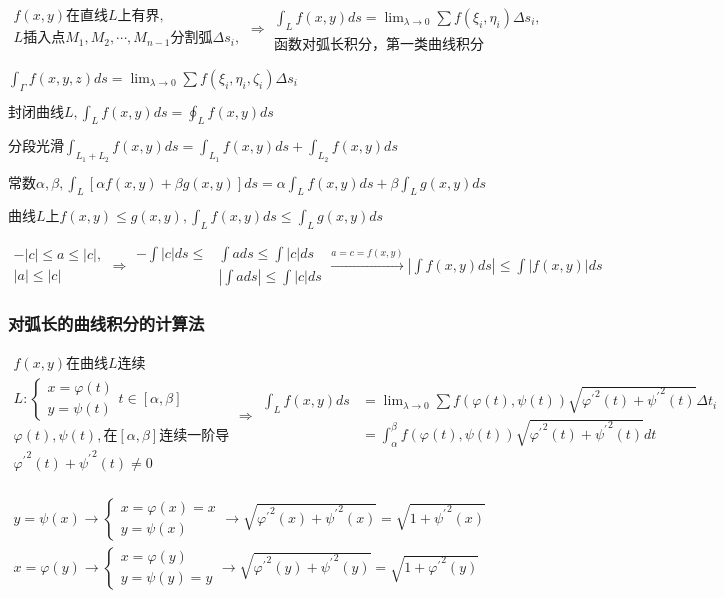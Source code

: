 \documentclass[UTF8]{ctexart}
\newcommand{\mt}[1]{\text{#1}}
\newcommand{\mb}[1]{\textbf{#1}}
\newcommand{\mf}[1]{\left( #1\right)}
\newcommand{\mfa}[1]{\left| #1\right|}
\newcommand{\mfc}[1]{\left[ #1 \right]}
\newcommand{\p}{\par}
\newcommand{\ma}[1]{\begin{array}{llll} #1 \end{array}}
\newcommand{\fcz}[1] {
    \left\{
        \begin{array}{llll} #1 \end{array}
    \right.
}
\begin{document}
$\ma{f\mf{x,y}\mt{在直线}L\mt{上有界},\\
L\mt{插入点}M_1,M_2,\cdots,M_{n-1}\mt{分割弧}\Delta s_i,\\
}\Rightarrow
\ma{\int_Lf\mf{x,y}ds=\lim_{\lambda \rightarrow 0}\sum f\mf{\xi_i,\eta_i}\Delta s_i,\\ 
\mb{函数对弧长积分，第一类曲线积分}}$\p

$\int_\Gamma f\mf{x,y,z}ds=\lim_{\lambda \rightarrow 0}\sum f\mf{\xi_i,\eta_i,\zeta_i}\Delta s_i$

$\mt{封闭曲线}L,\int_Lf\mf{x,y}ds=\oint_Lf\mf{x,y}ds $

$\mt{分段光滑}\int_{L_1+L_2}f\mf{x,y}ds=\int_{L_1 }f\mf{x,y}ds+\int_{ L_2}f\mf{x,y}ds$

$\mt{常数}\alpha ,\beta,\int_L \mfc{\alpha f\mf{x,y}+\beta g\mf{x,y}} ds=\alpha\int_L f\mf{x,y}ds+\beta\int_L g\mf{x,y}ds$

$\mt{曲线}L\mt{上}f\mf{x,y}\leqslant g\mf{x,y}, \int_L f\mf{x,y}ds \leqslant \int_L g\mf{x,y}ds$

$\ma{-\mfa{c} \leqslant a \leqslant \mfa{c} ,\\ \mfa{a}\leqslant \mfa{c}}\Rightarrow   \ma{-\int \mfa{c}ds \leqslant &\int ads \leqslant \int \mfa{c}ds\\ &\mfa{\int ads}\leqslant \int \mfa{c}ds} \xrightarrow{a=c=f\mf{x,y} } \mfa{\int f\mf{x,y}ds}\leqslant \int \mfa{f\mf{x,y}}ds$

\subsubsection{对弧长的曲线积分的计算法}


$\ma{
    f\mf{x,y}\mt{在}\mt{曲线}L\mt{连续}\\
    L:\fcz{x=\varphi\mf{t}\\
            y=\psi\mf{t}}   t\in \mfc{\alpha,\beta}\\
    \varphi\mf{t},\psi\mf{t},\mt{在} \mfc{\alpha,\beta}\mt{连续一阶导}\\
    {\varphi^{'}}^2\mf{t}+{\psi^{'}}^2\mf{t} \neq 0\\
}\Rightarrow \ma{
    \int_Lf\mf{x,y}ds&=\lim_{\lambda \rightarrow 0}\sum f\mf{\varphi\mf{t},\psi\mf{t}}\sqrt{{\varphi^{'}}^2\mf{t}+{\psi^{'}}^2\mf{t}}\Delta t_i\\
    &=\int_\alpha^\beta f\mf{\varphi\mf{t},\psi\mf{t}}\sqrt{{\varphi^{'}}^2\mf{t}+{\psi^{'}}^2\mf{t}}dt
}$


$\ma{
    y=\psi\mf{x} \rightarrow \fcz{
        x=\varphi\mf{x}=x\\
        y=\psi\mf{x}
    }\rightarrow \sqrt{{\varphi^{'}}^2\mf{x}+{\psi^{'}}^2\mf{x}}=\sqrt{1+{\psi^{'}}^2\mf{x}}\\

    x=\varphi\mf{y} \rightarrow \fcz{
       
        x=\varphi\mf{y}\\
        y=\psi\mf{y}=y
    }\rightarrow \sqrt{{\varphi^{'}}^2\mf{y}+{\psi^{'}}^2\mf{y}}=\sqrt{1+{\varphi^{'}}^2\mf{y}}\\
}$
\end{document}
